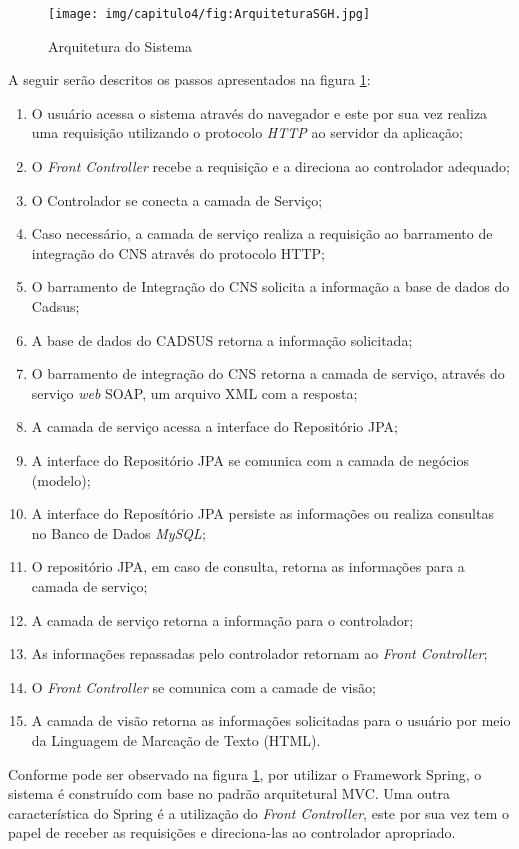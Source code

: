 \begin{figure}[H]
    \centering
     \caption{Arquitetura do Sistema}
    \texttt{[image: img/capitulo4/fig:ArquiteturaSGH.jpg]}
    \label{fig:ArquiteturaSGH}
\end{figure}

A seguir serão descritos os passos apresentados na figura \ref{fig:ArquiteturaSGH}:

\begin{enumerate}
	\item O usuário acessa o sistema através do navegador e este por sua vez realiza uma requisição utilizando o protocolo \textit{HTTP} ao servidor da aplicação;
	\item O \textit{Front Controller} recebe a requisição e a direciona ao controlador adequado;
	\item O Controlador se conecta a camada de Serviço;
	\item Caso necessário, a camada de serviço realiza a requisição ao barramento de integração do CNS através do protocolo HTTP;
	\item O barramento de Integração do CNS solicita a informação a base de dados do Cadsus;
	\item A base de dados do CADSUS retorna a informação solicitada;
	\item O barramento de integração do CNS retorna a camada de serviço, através do serviço \textit{web} SOAP, um arquivo XML com a resposta;
	\item A camada de serviço acessa a interface do Repositório JPA;
	\item A interface do Repositório JPA se comunica com a camada de negócios (modelo);
	\item A interface do Reposítório JPA persiste as informações ou realiza consultas no Banco de Dados \textit{MySQL};
	\item O repositório JPA, em caso de consulta, retorna as informações para a camada de serviço;
	\item A camada de serviço retorna a informação para o controlador;
	\item As informações repassadas pelo controlador retornam ao \textit{Front Controller};
	\item O \textit{Front Controller} se comunica com a camade de visão;
	\item A camada de visão retorna as informações solicitadas para o usuário por meio da Linguagem de Marcação de Texto (HTML).
\end{enumerate}

Conforme pode ser observado na figura \ref{fig:ArquiteturaSGH}, por utilizar o Framework Spring, o sistema é construído com base no padrão arquitetural MVC. Uma outra característica do Spring é a utilização do \textit{Front Controller}, este por sua vez tem o papel de receber as requisições e direciona-las ao controlador apropriado.













